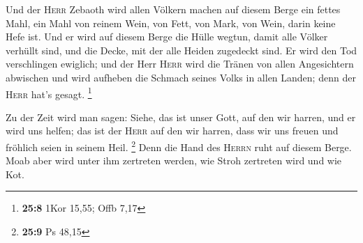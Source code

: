  Und der \textsc{Herr} Zebaoth wird allen Völkern machen
auf diesem Berge ein fettes Mahl, ein Mahl von reinem Wein, von Fett,
von Mark, von Wein, darin keine Hefe ist.  Und er wird auf
diesem Berge die Hülle wegtun, damit alle Völker verhüllt sind, und die
Decke, mit der alle Heiden zugedeckt sind.  Er wird den
Tod verschlingen ewiglich; und der Herr \textsc{Herr} wird die Tränen
von allen Angesichtern abwischen und wird aufheben die Schmach seines
Volks in allen Landen; denn der \textsc{Herr} hat's gesagt. \footnote{\textbf{25:8}
  1Kor 15,55; Offb 7,17}

 Zu der Zeit wird man sagen: Siehe, das ist unser Gott,
auf den wir harren, und er wird uns helfen; das ist der \textsc{Herr}
auf den wir harren, dass wir uns freuen und fröhlich seien in seinem
Heil. \footnote{\textbf{25:9} Ps 48,15}  Denn die Hand
des \textsc{Herrn} ruht auf diesem Berge. Moab aber wird unter ihm
zertreten werden, wie Stroh zertreten wird und wie Kot.

